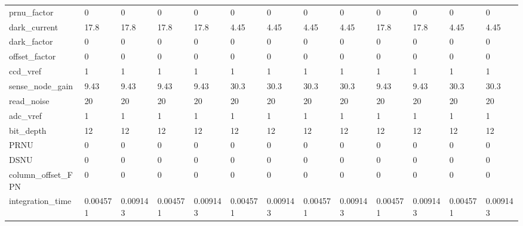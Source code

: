 \begin{table}
\begin{tabular}{lllllllllllll}
prnu\_factor            &         0 &         0 &         0 &         0 &         0 &         0 &         0 &         0 &         0 &         0 &         0 &         0 \\
dark\_current           &      17.8 &      17.8 &      17.8 &      17.8 &      4.45 &      4.45 &      4.45 &      4.45 &      17.8 &      17.8 &      4.45 &      4.45 \\
dark\_factor            &         0 &         0 &         0 &         0 &         0 &         0 &         0 &         0 &         0 &         0 &         0 &         0 \\
offset\_factor          &         0 &         0 &         0 &         0 &         0 &         0 &         0 &         0 &         0 &         0 &         0 &         0 \\
ccd\_vref               &         1 &         1 &         1 &         1 &         1 &         1 &         1 &         1 &         1 &         1 &         1 &         1 \\
sense\_node\_gain        &      9.43 &      9.43 &      9.43 &      9.43 &      30.3 &      30.3 &      30.3 &      30.3 &      9.43 &      9.43 &      30.3 &      30.3 \\
read\_noise             &        20 &        20 &        20 &        20 &        20 &        20 &        20 &        20 &        20 &        20 &        20 &        20 \\
adc\_vref               &         1 &         1 &         1 &         1 &         1 &         1 &         1 &         1 &         1 &         1 &         1 &         1 \\
bit\_depth              &        12 &        12 &        12 &        12 &        12 &        12 &        12 &        12 &        12 &        12 &        12 &        12 \\
PRNU                   &         0 &         0 &         0 &         0 &         0 &         0 &         0 &         0 &         0 &         0 &         0 &         0 \\
DSNU                   &         0 &         0 &         0 &         0 &         0 &         0 &         0 &         0 &         0 &         0 &         0 &         0 \\
column\_offset\_FPN      &         0 &         0 &         0 &         0 &         0 &         0 &         0 &         0 &         0 &         0 &         0 &         0 \\
integration\_time       &  0.004571 &  0.009143 &  0.004571 &  0.009143 &  0.004571 &  0.009143 &  0.004571 &  0.009143 &  0.004571 &  0.009143 &  0.004571 &  0.009143 \\

\end{tabular}
\end{table}
